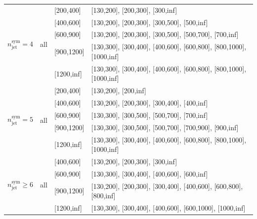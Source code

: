 \begin{table}[h!]
\begin{tabular}{ ccll }
    \hline
    \multirow{5}{*}{$n^{\mathrm{sym}}_{\mathrm{jet}} = 4$} & \multirow{5}{*}{all} & [200,400] & [130,200], [200,300], [300,inf] \\
    & & [400,600] & [130,200], [200,300], [300,500], [500,inf] \\
    & & [600,900] & [130,200], [200,300], [300,500], [500,700], [700,inf] \\
    & & [900,1200] & [130,300], [300,400], [400,600], [600,800], [800,1000], [1000,inf] \\
    & & [1200,inf] & [130,300], [300,400], [400,600], [600,800], [800,1000], [1000,inf] \\
    \hline
    \multirow{5}{*}{$n^{\mathrm{sym}}_{\mathrm{jet}} = 5$} & \multirow{5}{*}{all} & [200,400] & [130,200], [200,inf] \\
    & & [400,600] & [130,200], [200,300], [300,400], [400,inf] \\
    & & [600,900] & [130,300], [300,500], [500,700], [700,inf] \\
    & & [900,1200] & [130,300], [300,500], [500,700], [700,900], [900,inf] \\
    & & [1200,inf] & [130,300], [300,400], [400,600], [600,800], [800,1000], [1000,inf] \\
    \hline
    \multirow{4}{*}{$n^{\mathrm{sym}}_{\mathrm{jet}} \geq 6$} & \multirow{4}{*}{all} & [400,600] & [130,200], [200,300], [300,inf] \\
    & & [600,900] & [130,300], [300,400], [400,600], [600,inf] \\
    & & [900,1200] & [130,200], [200,300], [300,400], [400,600], [600,800], [800,inf] \\
    & & [1200,inf] & [130,300], [300,400], [400,600], [600,1000], [1000,inf] \\
    \hline
    \hline
  \end{tabular}
\end{table}
